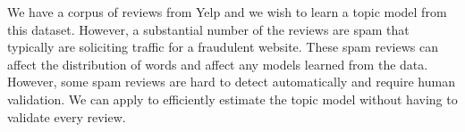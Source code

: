 \begin{example}\sloppy
We have a corpus of reviews from Yelp and we wish to learn a topic model from this dataset.
However, a substantial number of the reviews are spam that typically are soliciting traffic for a fraudulent website.
These spam reviews can affect the distribution of words and affect any models learned from the data.
However, some spam reviews are hard to detect automatically and require human validation.
We can apply \sys to efficiently estimate the topic model without having to validate every review.
\end{example}
 


